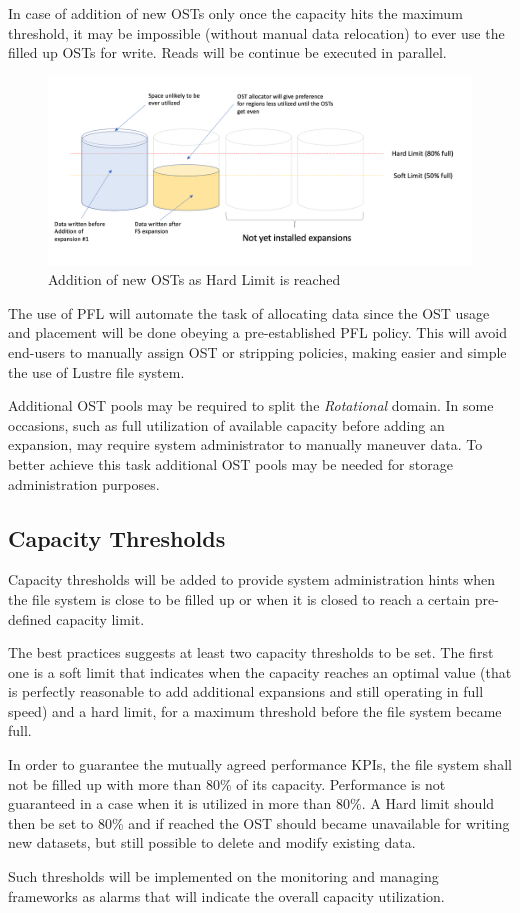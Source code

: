 \documentclass{article}
\begin{document}
In case of addition of new OSTs only once the capacity hits the maximum threshold, it may be impossible (without manual data relocation) to ever use the filled up OSTs for write. Reads will be continue be executed in parallel.

\begin{figure}[h]
    \centering
    \includegraphics[scale=0.50]{ost-fill up worst case.png}
    \caption{Addition of new OSTs as Hard Limit is reached}
    \label{fig:ost-fillup worst case}
\end{figure}


The use of PFL will automate the task of allocating data since the OST usage and placement will be done obeying a pre-established PFL policy. This will avoid end-users to manually assign OST or stripping policies, making easier and simple the use of Lustre file system.

Additional OST pools may be required to split the \textit{Rotational} domain. In some occasions, such as full utilization of available capacity before adding an expansion, may require system administrator to manually maneuver data. To better achieve this task additional OST pools may be needed for storage administration purposes.

\subsection{Capacity Thresholds}
Capacity thresholds will be added to provide system administration hints when the file system is close to be filled up or when it is closed to reach a certain pre-defined capacity limit. 

The best practices suggests at least two capacity thresholds to be set. The first one is a soft limit that indicates when the capacity reaches an optimal value (that is perfectly reasonable to add additional expansions and still operating in full speed) and a hard limit, for a maximum threshold before the file system became full.

In order to guarantee the mutually agreed performance KPIs, the file system shall not be filled up with more than 80\% of its capacity. Performance is not guaranteed in a case when it is utilized in more than 80\%. A Hard limit should then be set to 80\% and if reached the OST should became unavailable for writing new datasets, but still possible to delete and modify existing data. 

Such thresholds will be implemented on the monitoring and managing frameworks as alarms that will indicate the overall capacity utilization.
\end{document}
